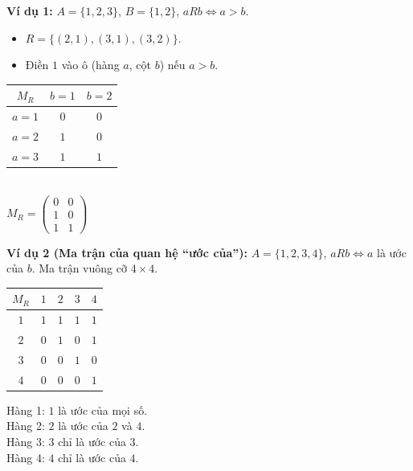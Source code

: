 \documentclass[12pt,a4paper]{article}
\begin{document}
\noindent
\begin{minipage}[c]{0.54\textwidth}
\textbf{\textcolor{AccentRed}{Ví dụ 1:}} $A = \{1, 2, 3\}$, $B = \{1, 2\}$, $aRb \iff a > b$.
\begin{itemize}
  \item $R = \{(2, 1), (3, 1), (3, 2)\}$.
  \item Điền $1$ vào ô (hàng $a$, cột $b$) nếu $a > b$.
\end{itemize}
\end{minipage}
\hfill
\begin{minipage}[c]{0.42\textwidth}
\centering
\renewcommand{\arraystretch}{1.15}
\begin{tabular}{c|cc}
$M_R$ & $b=1$ & $b=2$ \\ \hline
$a=1$ & $0$ & $0$ \\
$a=2$ & \textcolor{AccentRed}{$1$} & $0$ \\
$a=3$ & \textcolor{AccentRed}{$1$} & \textcolor{AccentRed}{$1$} \\
\end{tabular}\\[8pt]
$M_R = \begin{pmatrix} 0 & 0 \\ 1 & 0 \\ 1 & 1 \end{pmatrix}$
\end{minipage}

\vspace{8pt}
\textbf{\textcolor{AccentRed}{Ví dụ 2 (Ma trận của quan hệ ``ước của''):}} $A = \{1, 2, 3, 4\}$, $aRb \iff a$ là ước của $b$. Ma trận vuông cỡ $4 \times 4$.

\noindent
\begin{minipage}[c]{0.40\textwidth}
\centering
\renewcommand{\arraystretch}{1.15}
\begin{tabular}{c|cccc}
$M_R$ & $1$ & $2$ & $3$ & $4$ \\ \hline
$1$ & $1$ & $1$ & $1$ & $1$ \\
$2$ & $0$ & $1$ & $0$ & $1$ \\
$3$ & $0$ & $0$ & $1$ & $0$ \\
$4$ & $0$ & $0$ & $0$ & $1$ \\
\end{tabular}
\end{minipage}
\hfill
\begin{minipage}[c]{0.56\textwidth}
Hàng 1: $1$ là ước của mọi số.\\
Hàng 2: $2$ là ước của $2$ và $4$.\\
Hàng 3: $3$ chỉ là ước của $3$.\\
Hàng 4: $4$ chỉ là ước của $4$.
\end{minipage}
\end{document}
